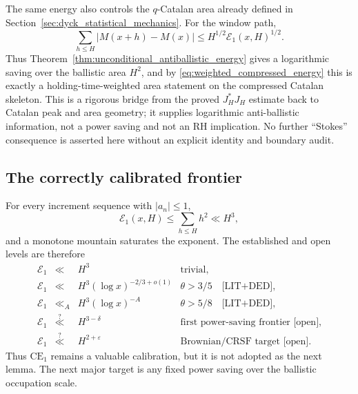 \documentclass[11pt]{amsart}
\numberwithin{equation}{section}
\theoremstyle{plain}
\theoremstyle{definition}
\theoremstyle{remark}
\newcommand{\Mert}{M}
\newcommand{\eps}{\varepsilon}
\begin{document}
The same energy also controls the $q$-Catalan area already defined in
Section~\ref{sec:dyck_statistical_mechanics}.  For the window path,
\begin{equation}
 \sum_{h\leq H}|\Mert(x+h)-\Mert(x)|
 \leq H^{1/2}\mathcal E_1(x,H)^{1/2}.
\label{eq:area_from_quadratic_energy}
\end{equation}
Thus Theorem~\ref{thm:unconditional_antiballistic_energy} gives a logarithmic
saving over the ballistic area $H^2$, and by
\eqref{eq:weighted_compressed_energy} this is exactly a holding-time-weighted
area statement on the compressed Catalan skeleton.  This is a rigorous bridge
from the proved $J_H^*J_H$ estimate back to Catalan peak and area geometry;
it supplies logarithmic anti-ballistic information, not a power saving and
not an RH implication.  No further ``Stokes'' consequence is asserted here
without an explicit identity and boundary audit.

\subsection{The correctly calibrated frontier}
\label{subsec:antiballistic_frontier}

For every increment sequence with $|a_n|\leq1$,
\begin{equation}
 \mathcal E_1(x,H)\leq\sum_{h\leq H}h^2\ll H^3,
\end{equation}
and a monotone mountain saturates the exponent.  The established and open
levels are therefore
\begin{equation}
\boxed{
\begin{array}{rcll}
\mathcal E_1&\ll&H^3&\text{trivial},\\
\mathcal E_1&\ll&H^3(\log x)^{-2/3+o(1)}
 &\theta>3/5\quad\text{[LIT+DED]},\\
\mathcal E_1&\ll_A&H^3(\log x)^{-A}
 &\theta>5/8\quad\text{[LIT+DED]},\\
\mathcal E_1&\stackrel{?}{\ll}&H^{3-\delta}
 &\text{first power-saving frontier [open]},\\
\mathcal E_1&\stackrel{?}{\ll}&H^{2+\eps}
 &\text{Brownian/CRSF target [open]}.
\end{array}}
\label{eq:antiballistic_ladder}
\end{equation}
Thus $\mathrm{CE}_1$ remains a valuable calibration, but it is not adopted as
the next lemma.  The next major target is any fixed power saving over the
ballistic occupation scale.
\end{document}
